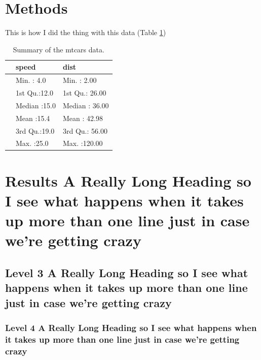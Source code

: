 \documentclass[
  10pt,
]{report}
\begin{document}
\hypertarget{methods}{%
\section{Methods}\label{methods}}

This is how I did the thing with this data (Table \ref{tab:testtable})

\begin{table}

\caption{\label{tab:testtable}Summary of the mtcars data.}
\centering
\begin{tabular}[t]{lll}
\toprule
  &     speed &      dist\\
\midrule
 & Min.   : 4.0 & Min.   :  2.00\\
 & 1st Qu.:12.0 & 1st Qu.: 26.00\\
 & Median :15.0 & Median : 36.00\\
 & Mean   :15.4 & Mean   : 42.98\\
 & 3rd Qu.:19.0 & 3rd Qu.: 56.00\\
\addlinespace
 & Max.   :25.0 & Max.   :120.00\\
\bottomrule
\end{tabular}
\end{table}

\hypertarget{results-a-really-long-heading-so-i-see-what-happens-when-it-takes-up-more-than-one-line-just-in-case-were-getting-crazy}{%
\section{Results A Really Long Heading so I see what happens when it takes up more than one line just in case we're getting crazy}\label{results-a-really-long-heading-so-i-see-what-happens-when-it-takes-up-more-than-one-line-just-in-case-were-getting-crazy}}

\hypertarget{level-3-a-really-long-heading-so-i-see-what-happens-when-it-takes-up-more-than-one-line-just-in-case-were-getting-crazy}{%
\subsection{Level 3 A Really Long Heading so I see what happens when it takes up more than one line just in case we're getting crazy}\label{level-3-a-really-long-heading-so-i-see-what-happens-when-it-takes-up-more-than-one-line-just-in-case-were-getting-crazy}}

\hypertarget{level-4-a-really-long-heading-so-i-see-what-happens-when-it-takes-up-more-than-one-line-just-in-case-were-getting-crazy}{%
\subsubsection{Level 4 A Really Long Heading so I see what happens when it takes up more than one line just in case we're getting crazy}\label{level-4-a-really-long-heading-so-i-see-what-happens-when-it-takes-up-more-than-one-line-just-in-case-were-getting-crazy}}
\end{document}
